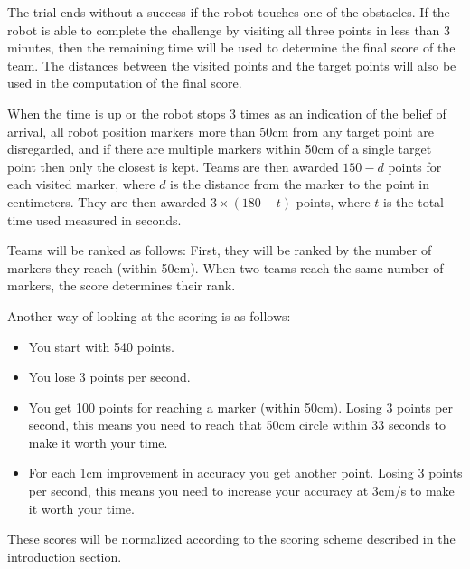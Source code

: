 \documentclass{article}
\begin{document}
The trial ends without a success if the robot touches one of the obstacles. If the robot is able to complete the challenge by visiting all three points in less than 3 minutes, then the remaining time will be used to determine the final score of the team. The distances between the visited points and the target points will also be used in the computation of the final score.

When the time is up or the robot stops 3 times as an indication of the belief of arrival, all robot position markers more than 50cm from any target point are disregarded, and if there are multiple markers within 50cm of a single target point then only the closest is kept. Teams are then awarded $150 - d$ points for each visited marker, where $d$ is the distance from the marker to the point in centimeters. They are then awarded $3 \times (180 - t)$ points, where $t$ is the total time used measured in seconds.

Teams will be ranked as follows: First, they will be ranked by the number of markers they reach (within 50cm). When two teams reach the same number of markers, the score determines their rank.

Another way of looking at the scoring is as follows:

\begin{itemize}
 \item You start with 540 points.
 \item You lose 3 points per second.
 \item You get 100 points for reaching a marker (within 50cm). Losing 3 points per second, this means you need to reach that 50cm circle within 33 seconds to make it worth your time.
 \item For each 1cm improvement in accuracy you get another point. Losing 3 points per second, this means you need to increase your accuracy at 3cm/s to make it worth your time. 
\end{itemize}

These scores will be normalized according to the scoring scheme described in the introduction section.
\end{document}

